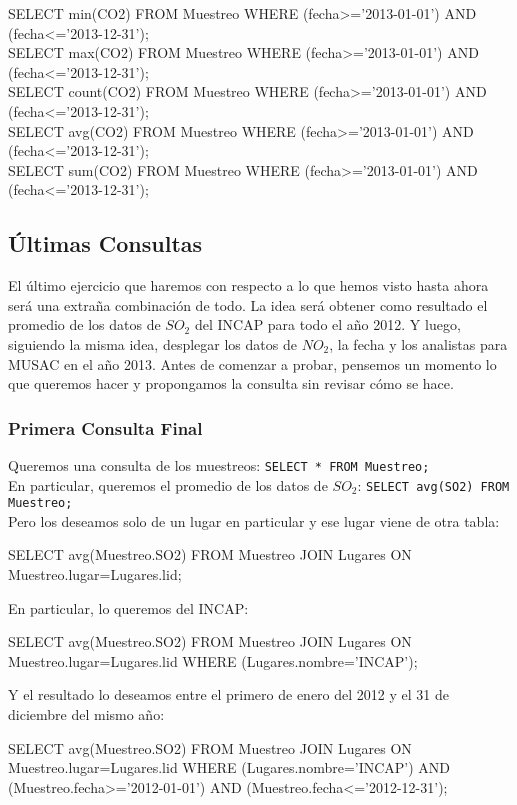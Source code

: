 \documentclass[10pt,letterpaper]{article}
\newcommand{\inlinecode}[1]{
\colorbox{light-gray}{\texttt{#1}}
}
\newenvironment{Code}
{
\begin{lrbox}{\selvestebox}%
\begin{minipage}{\dimexpr\columnwidth-2\fboxsep\relax}
\fontfamily{\ttdefault}\selectfont
}
{\end{minipage}\end{lrbox}%
\begin{center}
\colorbox{light-gray}{\usebox{\selvestebox}}
\end{center}
}
\begin{document}
\begin{Code}
SELECT min(CO2) FROM Muestreo WHERE (fecha>='2013-01-01') AND (fecha<='2013-12-31');\\
SELECT max(CO2) FROM Muestreo WHERE (fecha>='2013-01-01') AND (fecha<='2013-12-31');\\
SELECT count(CO2) FROM Muestreo WHERE (fecha>='2013-01-01') AND (fecha<='2013-12-31');\\
SELECT avg(CO2) FROM Muestreo WHERE (fecha>='2013-01-01') AND (fecha<='2013-12-31');\\
SELECT sum(CO2) FROM Muestreo WHERE (fecha>='2013-01-01') AND (fecha<='2013-12-31');
\end{Code}

\subsection{\'Ultimas Consultas}
El \'ultimo ejercicio que haremos con respecto a lo que hemos visto hasta ahora ser\'a una extra\~na combinaci\'on de todo. La idea ser\'a obtener como resultado el promedio de los datos de $SO_2$ del INCAP para todo el a\~no 2012. Y luego, siguiendo la misma idea, desplegar los datos de $NO_2$, la fecha y los analistas para MUSAC en el a\~no 2013. Antes de comenzar a probar, pensemos un momento lo que queremos hacer y propongamos la consulta sin revisar c\'omo se hace.\\

\subsubsection{Primera Consulta Final}

\noindent Queremos una consulta de los muestreos: \inlinecode{SELECT * FROM Muestreo;}\\
En particular, queremos el promedio de los datos de $SO_2$: \inlinecode{SELECT avg(SO2) FROM Muestreo;}\\
Pero los deseamos solo de un lugar en particular y ese lugar viene de otra tabla:
\begin{Code}
SELECT avg(Muestreo.SO2) FROM Muestreo JOIN Lugares ON Muestreo.lugar=Lugares.lid;
\end{Code}
En particular, lo queremos del INCAP:
\begin{Code}
SELECT avg(Muestreo.SO2) FROM Muestreo JOIN Lugares ON Muestreo.lugar=Lugares.lid WHERE (Lugares.nombre='INCAP');
\end{Code}
Y el resultado lo deseamos entre el primero de enero del 2012 y el 31 de diciembre del mismo a\~no:
\begin{Code}
SELECT avg(Muestreo.SO2) FROM Muestreo JOIN Lugares ON Muestreo.lugar=Lugares.lid WHERE (Lugares.nombre='INCAP') AND (Muestreo.fecha>='2012-01-01') AND (Muestreo.fecha<='2012-12-31');
\end{Code}
\end{document}
